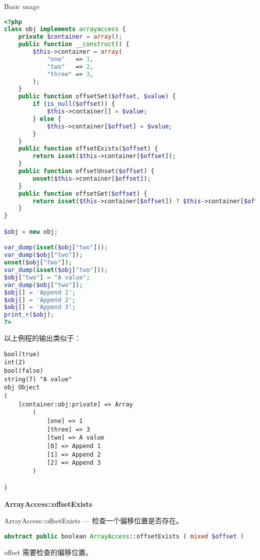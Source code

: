\begin{example}
Basic usage
\begin{lstlisting}[language=PHP]
<?php
class obj implements arrayaccess {
    private $container = array();
    public function __construct() {
        $this->container = array(
            "one"   => 1,
            "two"   => 2,
            "three" => 3,
        );
    }
    public function offsetSet($offset, $value) {
        if (is_null($offset)) {
            $this->container[] = $value;
        } else {
            $this->container[$offset] = $value;
        }
    }
    public function offsetExists($offset) {
        return isset($this->container[$offset]);
    }
    public function offsetUnset($offset) {
        unset($this->container[$offset]);
    }
    public function offsetGet($offset) {
        return isset($this->container[$offset]) ? $this->container[$offset] : null;
    }
}

$obj = new obj;

var_dump(isset($obj["two"]));
var_dump($obj["two"]);
unset($obj["two"]);
var_dump(isset($obj["two"]));
$obj["two"] = "A value";
var_dump($obj["two"]);
$obj[] = 'Append 1';
$obj[] = 'Append 2';
$obj[] = 'Append 3';
print_r($obj);
?>
\end{lstlisting}
\end{example}


以上例程的输出类似于：

\begin{verbatim}
bool(true)
int(2)
bool(false)
string(7) "A value"
obj Object
(
    [container:obj:private] => Array
        (
            [one] => 1
            [three] => 3
            [two] => A value
            [0] => Append 1
            [1] => Append 2
            [2] => Append 3
        )

)
\end{verbatim}



\textbf{ArrayAccess::offsetExists}

ArrayAccess::offsetExists — 检查一个偏移位置是否存在。


\begin{lstlisting}[language=PHP]
abstract public boolean ArrayAccess::offsetExists ( mixed $offset )
\end{lstlisting}

\begin{compactitem}
\item offset
需要检查的偏移位置。
\end{compactitem}

